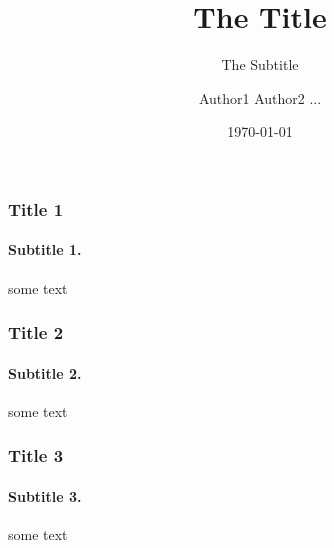 \documentclass[aspectratio=1610, t]{beamer}
\title{The Title}
\subtitle{The Subtitle}
\date{\today}
\author{Author1 Author2 ...}
\institute{Institute}
\begin{document}
	
	\begin{frame}%
		\titlepage
	\end{frame}
	
	\begin{frame}%
		\frametitle{Title 1} 
		\framesubtitle{Subtitle 1.} 
		some text
	\end{frame}
	
	\begin{frame}%
		\frametitle{Title 2} 
		\framesubtitle{Subtitle 2.}  
		some text
	\end{frame}
	
	\begin{frame}%
		\frametitle{Title 3} 
		\framesubtitle{Subtitle 3.} 
		
		some text
	\end{frame}
	
\end{document}
